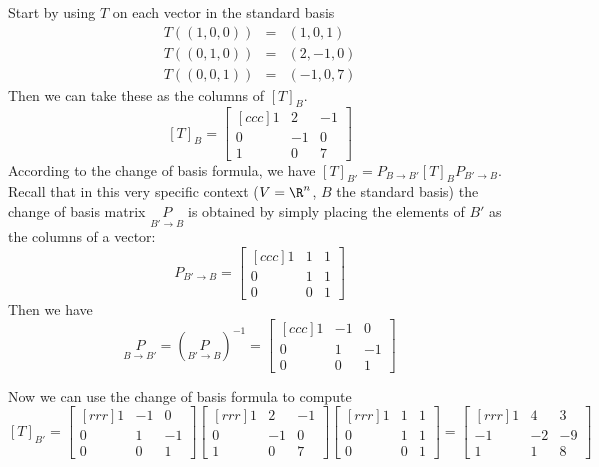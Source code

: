 \begin{solution}
\noindent
Start by using $T$ on each vector in the standard basis
\begin{eqnarray*}
T((1,0,0)) &=& (1,0,1)\\
T((0,1,0)) &=& (2,-1,0)\\
T((0,0,1)) &=& (-1,0,7)
\end{eqnarray*}
Then we can take these as the columns of $[T]_B$.
$$
[T]_B =
\begin{bmatrix}[ccc]
1&2&-1\\
0&-1&0\\
1&0&7
\end{bmatrix}
$$
According to the change of basis formula, we have  $[T]_{B'} = P_{B\rightarrow B'}[T]_BP_{B'\rightarrow B}$. 
Recall that in this very specific context ($V=\R^n$, $B$ the standard basis) the change of basis matrix $\underset{B'\rightarrow B}{P}$ is obtained by simply placing the elements of $B'$ as the columns of a vector: 
\[
P_{B'\rightarrow B} =
\begin{bmatrix}[ccc]
1&1&1\\
0&1&1\\
0&0&1
\end{bmatrix}
\]
Then we have 
\[
\underset{B\rightarrow B'}{P}=(\underset{B'\rightarrow B}{P})^{-1}=
\begin{bmatrix}[ccc]
1&-1&0\\
0&1&-1\\
0&0&1
\end{bmatrix}
\]

Now we can use the change of basis formula to compute 
\[
[T]_{B'} = 
\begin{bmatrix}[rrr]
1&-1&0\\
0&1&-1\\
0&0&1
\end{bmatrix}
\begin{bmatrix}[rrr]
1&2&-1\\
0&-1&0\\
1&0&7
\end{bmatrix}
\begin{bmatrix}[rrr]
1&1&1\\
0&1&1\\
0&0&1
\end{bmatrix} =
\begin{bmatrix}[rrr]
1&4&3\\
-1&-2&-9\\
1&1&8
\end{bmatrix}
\]
\end{solution}

